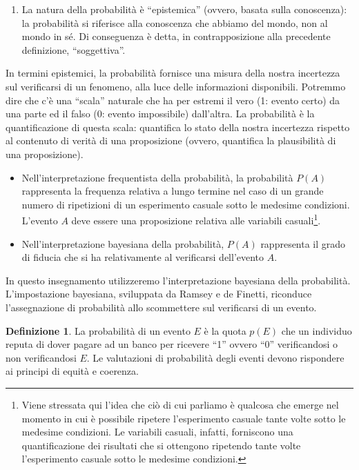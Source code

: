 \documentclass[
  11pt,
]{krantz}
\providecommand{\tightlist}{%
  \setlength{\itemsep}{0pt}\setlength{\parskip}{0pt}}
\theoremstyle{definition}
\newtheorem{definition}{Definizione}[chapter]
\theoremstyle{definition}
\theoremstyle{definition}
\theoremstyle{definition}
\theoremstyle{remark}
\begin{document}
\begin{enumerate}
\def\labelenumi{(\alph{enumi})}
\setcounter{enumi}{1}
\tightlist
\item
  La natura della probabilità è ``epistemica'' (ovvero, basata sulla conoscenza): la probabilità si riferisce alla conoscenza che abbiamo del mondo, non al mondo in sé. Di conseguenza è detta, in contrapposizione alla precedente definizione, ``soggettiva''.
\end{enumerate}

In termini epistemici, la probabilità fornisce una misura della nostra incertezza sul verificarsi di un fenomeno, alla luce delle informazioni disponibili. Potremmo dire che c'è una ``scala'' naturale che ha per estremi il vero (1: evento certo) da una parte ed il falso (0: evento impossibile) dall'altra. La probabilità è la quantificazione di questa scala: quantifica lo stato della nostra incertezza rispetto al contenuto di verità di una proposizione (ovvero, quantifica la plausibilità di una proposizione).

\begin{itemize}
\tightlist
\item
  Nell'interpretazione frequentista della probabilità, la probabilità \(P(A)\) rappresenta la frequenza relativa a lungo termine nel caso di un grande numero di ripetizioni di un esperimento casuale sotto le medesime condizioni. L'evento \(A\) deve essere una proposizione relativa alle variabili casuali\footnote{Viene stressata qui l'idea che ciò di cui parliamo è qualcosa che emerge nel momento in cui è possibile ripetere l'esperimento casuale tante volte sotto le medesime condizioni. Le variabili casuali, infatti, forniscono una quantificazione dei risultati che si ottengono ripetendo tante volte l'esperimento casuale sotto le medesime condizioni.}.
\item
  Nell'interpretazione bayesiana della probabilità, \(P(A)\) rappresenta il grado di fiducia che si ha relativamente al verificarsi dell'evento \(A\).
\end{itemize}

In questo insegnamento utilizzeremo l'interpretazione bayesiana della probabilità. L'impostazione bayesiana, sviluppata da Ramsey e de Finetti, riconduce l'assegnazione di probabilità allo scommettere sul verificarsi di un evento.

\begin{definition}
La probabilità di un evento \(E\) è la quota \(p(E)\) che un individuo reputa di dover pagare ad un banco per ricevere ``1'' ovvero ``0'' verificandosi o non verificandosi \(E\). Le valutazioni di probabilità degli eventi devono rispondere ai principi di equità e coerenza.
\end{definition}
\end{document}
